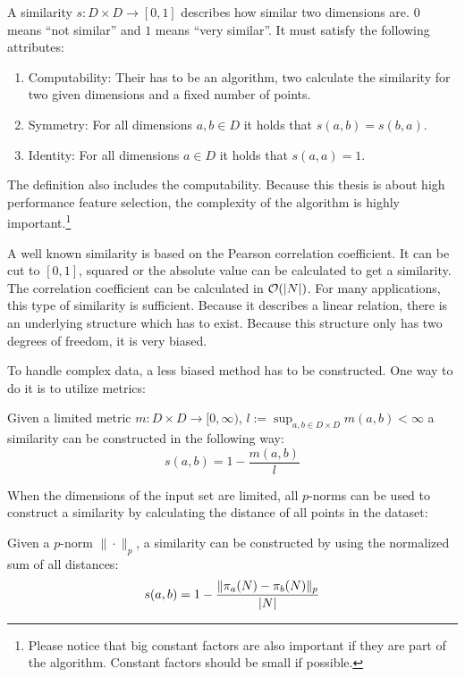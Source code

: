 \begin{envdef}[Similarity]
	A similarity $s : D \times D \rightarrow [0,1]$ describes how similar two dimensions are. $0$ means ``not similar'' and $1$ means ``very similar''. It must satisfy the following attributes:
	\begin{enumerate}
		\item Computability: Their has to be an algorithm, two calculate the similarity for two given dimensions and a fixed number of points.
		\item Symmetry: For all dimensions $a,b \in D$ it holds that $s(a,b) = s(b,a)$.
		\item Identity: For all dimensions $a \in D$ it holds that $s(a,a) = 1$.
	\end{enumerate}
\end{envdef}

The definition also includes the computability. Because this thesis is about high performance feature selection, the complexity of the algorithm is highly important.\footnote{Please notice that big constant factors are also important if they are part of the algorithm. Constant factors should be small if possible.}

A well known similarity is based on the Pearson correlation coefficient. It can be cut to $[0,1]$, squared or the absolute value can be calculated to get a similarity. The correlation coefficient can be calculated in $\mathcal{O}(\left|N\right|)$. For many applications, this type of similarity is sufficient. Because it describes a linear relation, there is an underlying structure which has to exist. Because this structure only has two degrees of freedom, it is very biased.

To handle complex data, a less biased method has to be constructed. One way to do it is to utilize metrics:

\begin{envtheo}
	Given a limited metric $m : D \times D \rightarrow [0,\infty)$, $l := \sup_{a,b \in D \times D} m(a,b) < \infty$ a similarity can be constructed in the following way:
	\begin{equation}
		s(a,b) = 1 - \frac{m(a,b)}{l}
	\end{equation}
\end{envtheo}

When the dimensions of the input set are limited, all $p$-norms can be used to construct a similarity by calculating the distance of all points in the dataset:

\begin{envtheo}
	Given a $p$-norm $\|\cdot\|_p$, a similarity can be constructed by using the normalized sum of all distances:
	\begin{equation}
		s(a,b) = 1 - \frac{\|\pi_a(N) - \pi_b(N)\|_p}{\left|N\right|}
	\end{equation}
\end{envtheo}

